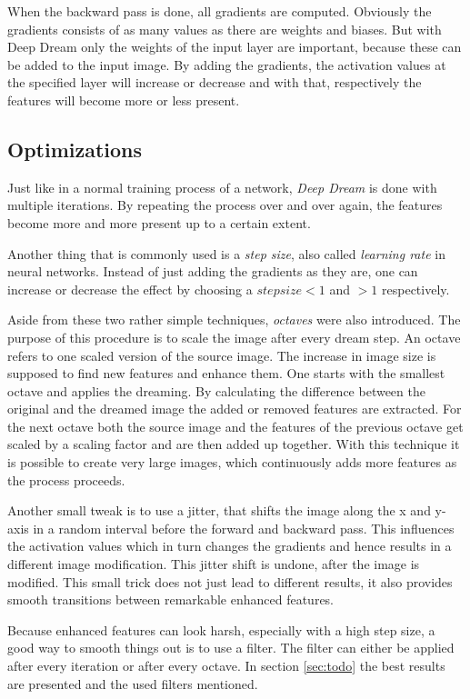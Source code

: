 When the backward pass is done, all gradients are computed.
Obviously the gradients consists of as many values as there are weights and biases.
But with Deep Dream only the weights of the input layer are important, because these can be added to the input image.
By adding the gradients, the activation values at the specified layer will increase or decrease and with that, respectively the features will become more or less present.

\subsection{Optimizations}
\label{sec:optimizations}
Just like in a normal training process of a network, \emph{Deep Dream} is done with multiple iterations.
By repeating the process over and over again, the features become more and more present up to a certain extent.

Another thing that is commonly used is a \emph{step size}, also called \emph{learning rate} in neural networks.
Instead of just adding the gradients as they are, one can increase or decrease the effect by choosing a $step size < 1$ and $> 1$ respectively.

Aside from these two rather simple techniques, \emph{octaves} were also introduced.
The purpose of this procedure is to scale the image after every dream step.
An octave refers to one scaled version of the source image.
The increase in image size is supposed to find new features and enhance them.
One starts with the smallest octave and applies the dreaming.
By calculating the difference between the original and the dreamed image the added or removed features are extracted.
For the next octave both the source image and the features of the previous octave get scaled by a scaling factor and are then added up together.
With this technique it is possible to create very large images, which continuously adds more features as the process proceeds.

 
Another small tweak is to use a jitter, that shifts the image along the x and y-axis in a random interval before the forward and backward pass.
This influences the activation values which in turn changes the gradients and hence results in a different image modification.
This jitter shift is undone, after the image is modified.
This small trick does not just lead to different results, it also provides smooth transitions between remarkable enhanced features.

Because enhanced features can look harsh, especially with a high step size, a good way to smooth things out is to use a filter. 
The filter can either be applied after every iteration or after every octave.
In section \ref{sec:todo} the best results are presented and the used filters mentioned.



